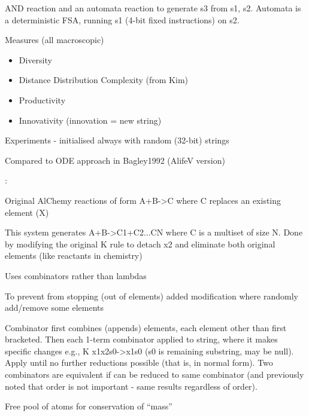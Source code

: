 			AND reaction and an automata reaction to generate s3 from s1, s2.
			Automata is a deterministic FSA, running s1 (4-bit fixed instructions)
			on s2.
			

			Measures (all macroscopic)
			
			
			\begin{itemize}
				\item
				
				Diversity
				
				\item
				
				Distance Distribution Complexity (from Kim)
				
				\item
				
				Productivity
				
				\item
				
				Innovativity (innovation = new string)
				
			\end{itemize}

			
			Experiments - initialised always with random (32-bit) strings

			
			Compared to ODE approach in Bagley1992 (AlifeV version)
			
	
\autocite{Fenizio2000}:
		
			
			Original AlChemy reactions of form A+B-\textgreater{}C where C
			replaces an existing element (X)

			
			This system generates A+B-\textgreater{}C1+C2...CN where C is a
			multiset of size N. Done by modifying the original K rule to detach x2
			and eliminate both original elements (like reactants in chemistry)

			Uses combinators rather than lambdas

			To prevent from stopping (out of elements) added modification where
			randomly add/remove some elements

			Combinator first combines (appends) elements, each element other than
			first bracketed. Then each 1-term combinator applied to string, where
			it makes specific changes e.g., K x1x2s0-\textgreater{}x1s0 (s0 is
			remaining substring, may be null). Apply until no further reductions
			possible (that is, in normal form). Two combinators are equivalent if
			can be reduced to same combinator (and previously noted that order is
			not important - same results regardless of order).

			
			Free pool of atoms for conservation of ``mass''
			

